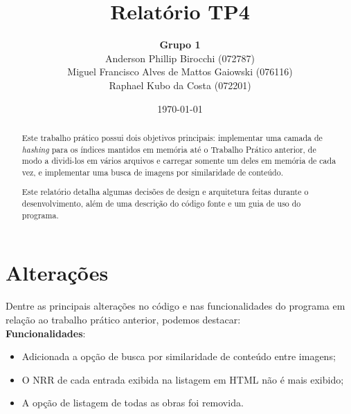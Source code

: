 \documentclass[a4paper,10pt]{article}
\title{\textbf{Relatório TP4}}
\author{\textbf{Grupo 1} \\
  Anderson Phillip Birocchi (072787) \\
  Miguel Francisco Alves de Mattos Gaiowski (076116) \\
  Raphael Kubo da Costa (072201)}
\date{\today}
\begin{document}
\maketitle

\begin{abstract}
Este trabalho prático possui dois objetivos principais: implementar uma camada de \textit{hashing} para os índices mantidos em memória até o Trabalho Prático anterior, de modo a dividi-los em vários arquivos e carregar somente um deles em memória de cada vez, e implementar uma busca de imagens por similaridade de conteúdo.

Este relatório detalha algumas decisões de design e arquitetura feitas durante o desenvolvimento, além de uma descrição do código fonte e um guia de uso do programa.
\end{abstract}

\section{Alterações}
Dentre as principais alterações no código e nas funcionalidades do programa em relação ao trabalho prático anterior, podemos destacar:\\

\textbf{Funcionalidades}:
\begin{itemize}
\item Adicionada a opção de busca por similaridade de conteúdo entre imagens;
\item O NRR de cada entrada exibida na listagem em HTML não é mais exibido;
\item A opção de listagem de todas as obras foi removida.
\end{itemize}
\end{document}
